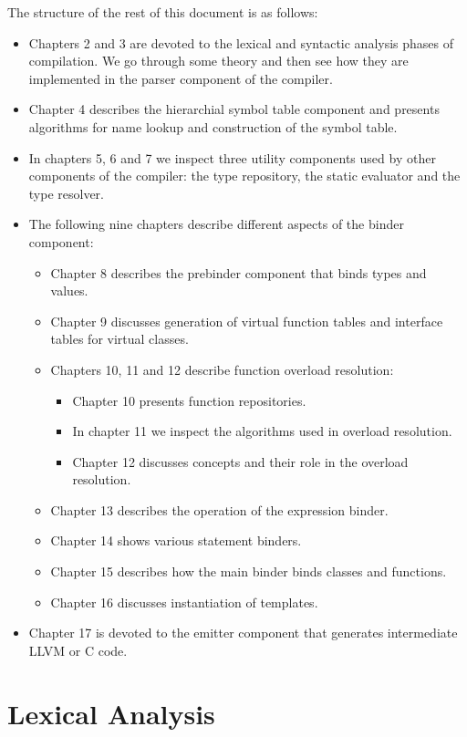 \documentclass[a4paper,oneside,11pt]{book}
\theoremstyle{definition}
\begin{document}
The structure of the rest of this document is as follows:
\begin{itemize}
\item
Chapters 2 and 3 are devoted to the lexical and syntactic analysis phases of compilation.
We go through some theory and then see how they are implemented in the parser component of the compiler.
\item
Chapter 4 describes the hierarchial symbol table component and presents algorithms for name lookup and construction of the symbol table.
\item
In chapters 5, 6 and 7 we inspect three utility components used by other components of the compiler:
the type repository, the static evaluator and the type resolver.
\item
The following nine chapters describe different aspects of the binder component:
\begin{itemize}
\item
Chapter 8 describes the prebinder component that binds types and values.
\item
Chapter 9 discusses generation of virtual function tables and interface tables for virtual classes.
\item
Chapters 10, 11 and 12 describe function overload resolution:
\begin{itemize}
\item
Chapter 10 presents function repositories.
\item
In chapter 11 we inspect the algorithms used in overload resolution.
\item
Chapter 12 discusses concepts and their role in the overload resolution.
\end{itemize}
\item
Chapter 13 describes the operation of the expression binder.
\item
Chapter 14 shows various statement binders.
\item
Chapter 15 describes how the main binder binds classes and functions.
\item
Chapter 16 discusses instantiation of templates.
\end{itemize}
\item
Chapter 17 is devoted to the emitter component that generates intermediate LLVM or C code.
\end{itemize}

\chapter{Lexical Analysis}
\end{document}
